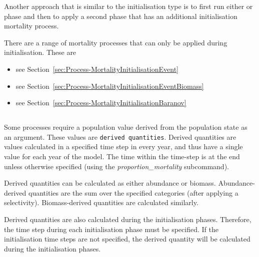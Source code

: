 \ifAgeBased
Another approach that is similar to the  initialisation type is to first run either  or  phase and then to apply a second  phase that has an additional initialisation mortality process.

There are a range of mortality processes that can only be applied during initialisation. These are

\begin{itemize}
	\item {} see Section~\ref{sec:Process-MortalityInitialisationEvent}
	\item {} see Section~\ref{sec:Process-MortalityInitialisationEventBiomass}
	\item {} see  Section~\ref{sec:Process-MortalityInitialisationBaranov}
\end{itemize}
\fi %

\subsection{}\label{sec:Process}

\ifAgeBased

\else

\fi 

\subsection{\label{sec:DerivedQuantity}}

Some processes require a population value derived from the population state as an argument. These values are \texttt{derived quantities}. Derived quantities are values calculated in a specified time step in every year, and thus have a single value for each year of the model. The time within the time-step is at the end unless otherwise specified (using the \textit{proportion\_mortality} subcommand).

Derived quantities can be calculated as either abundance or biomass. Abundance-derived quantities are the sum over the specified categories (after applying a selectivity)\label{sec:DerivedQuantity-Abundance}. Biomass-derived quantities are calculated similarly\label{sec:DerivedQuantity-Biomass}.

Derived quantities are also calculated during the initialisation phases. Therefore, the time step during each initialisation phase must be specified. If the initialisation time steps are not specified, the derived quantity will be calculated during the initialisation phases. 

